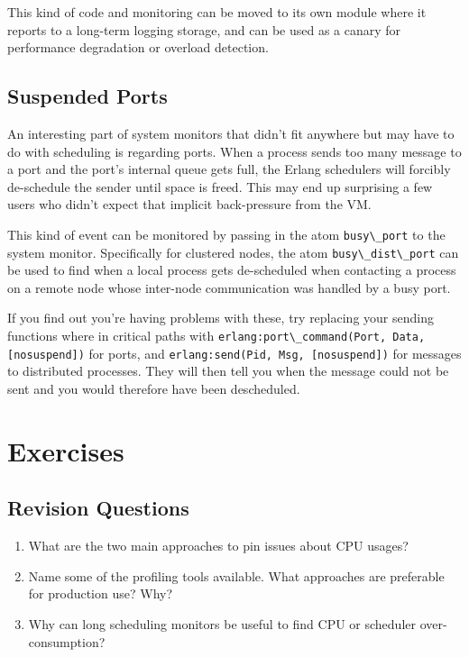 \documentclass[11pt, oneside]{book}   	%
\newcommand{\function}[1]{\Verb`#1`}
\newcommand{\term}[1]{\Verb`#1`}
\begin{document}
This kind of code and monitoring can be moved to its own module where it reports to a long-term logging storage, and can be used as a canary for performance degradation or overload detection.

\subsection{Suspended Ports}
\label{subsec:port-system-monitors}

An interesting part of system monitors that didn't fit anywhere but may have to do with scheduling is regarding ports. When a process sends too many message to a port and the port's internal queue gets full, the Erlang schedulers will forcibly de-schedule the sender until space is freed. This may end up surprising a few users who didn't expect that implicit back-pressure from the VM.

This kind of event can be monitored by passing in the atom \term{busy\_port} to the system monitor. Specifically for clustered nodes, the atom \term{busy\_dist\_port} can be used to find when a local process gets de-scheduled when contacting a process on a remote node whose inter-node communication was handled by a busy port.

If you find out you're having problems with these, try replacing your sending functions where in critical paths with \function{erlang:port\_command(Port, Data, [nosuspend])} for ports, and \function{erlang:send(Pid, Msg, [nosuspend])} for messages to distributed processes. They will then tell you when the message could not be sent and you would therefore have been descheduled.


\section{Exercises}

\subsection{Revision Questions}

\begin{enumerate}
	\item What are the two main approaches to pin issues about CPU usages?
	\item Name some of the profiling tools available. What approaches are preferable for production use? Why?
	\item Why can long scheduling monitors be useful to find CPU or scheduler over-consumption?

\end{enumerate}
\end{document}
